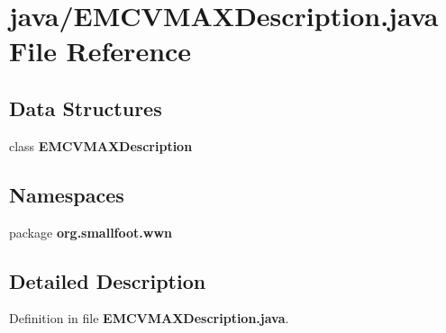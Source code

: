 \section{java/\-E\-M\-C\-V\-M\-A\-X\-Description.java \-File \-Reference}
\label{EMCVMAXDescription_8java}
\subsection*{\-Data \-Structures}
\begin{DoxyCompactItemize}
\item 
class {\bf \-E\-M\-C\-V\-M\-A\-X\-Description}
\end{DoxyCompactItemize}
\subsection*{\-Namespaces}
\begin{DoxyCompactItemize}
\item 
package {\bf org.\-smallfoot.\-wwn}
\end{DoxyCompactItemize}


\subsection{\-Detailed \-Description}


\-Definition in file {\bf \-E\-M\-C\-V\-M\-A\-X\-Description.\-java}.

